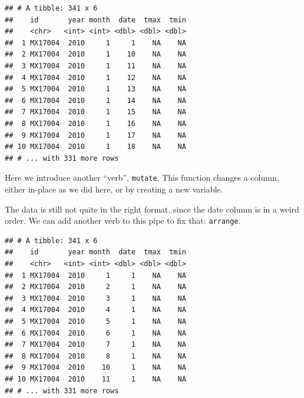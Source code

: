\documentclass[12pt,letterpaperpaper,openany]{book}
\newenvironment{Shaded}{\begin{snugshade}}{\end{snugshade}}
\newcommand{\DataTypeTok}[1]{\textcolor[rgb]{0.13,0.29,0.53}{#1}}
\newcommand{\KeywordTok}[1]{\textcolor[rgb]{0.13,0.29,0.53}{\textbf{#1}}}
\newcommand{\NormalTok}[1]{#1}
\newcommand{\OperatorTok}[1]{\textcolor[rgb]{0.81,0.36,0.00}{\textbf{#1}}}
\newcommand{\StringTok}[1]{\textcolor[rgb]{0.31,0.60,0.02}{#1}}
\begin{document}
\begin{Shaded}
\end{Shaded}

\begin{verbatim}
## # A tibble: 341 x 6
##    id       year month  date  tmax  tmin
##    <chr>   <int> <int> <dbl> <dbl> <dbl>
##  1 MX17004  2010     1     1    NA    NA
##  2 MX17004  2010     1    10    NA    NA
##  3 MX17004  2010     1    11    NA    NA
##  4 MX17004  2010     1    12    NA    NA
##  5 MX17004  2010     1    13    NA    NA
##  6 MX17004  2010     1    14    NA    NA
##  7 MX17004  2010     1    15    NA    NA
##  8 MX17004  2010     1    16    NA    NA
##  9 MX17004  2010     1    17    NA    NA
## 10 MX17004  2010     1    18    NA    NA
## # ... with 331 more rows
\end{verbatim}

Here we introduce another ``verb'', \texttt{mutate}. This function changes a column, either in-place as we did here,
or by creating a new variable.

The data is still not quite in the right format, since the date column is in a weird order. We can add
another verb to this pipe to fix that: \texttt{arrange}.

\begin{Shaded}
\end{Shaded}

\begin{verbatim}
## # A tibble: 341 x 6
##    id       year month  date  tmax  tmin
##    <chr>   <int> <int> <dbl> <dbl> <dbl>
##  1 MX17004  2010     1     1    NA    NA
##  2 MX17004  2010     2     1    NA    NA
##  3 MX17004  2010     3     1    NA    NA
##  4 MX17004  2010     4     1    NA    NA
##  5 MX17004  2010     5     1    NA    NA
##  6 MX17004  2010     6     1    NA    NA
##  7 MX17004  2010     7     1    NA    NA
##  8 MX17004  2010     8     1    NA    NA
##  9 MX17004  2010    10     1    NA    NA
## 10 MX17004  2010    11     1    NA    NA
## # ... with 331 more rows
\end{verbatim}
\end{document}
